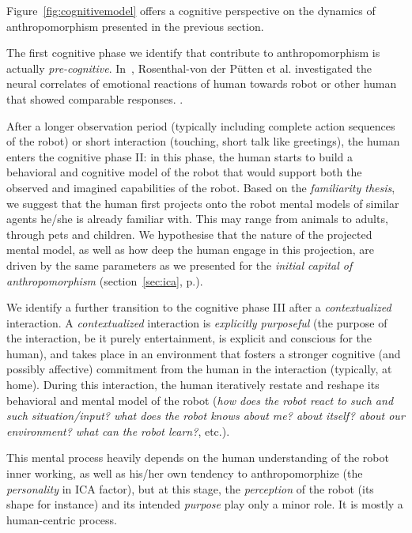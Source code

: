 \documentclass[twocolumn]{svjour3}          %
\begin{document}
Figure~\ref{fig:cognitivemodel} offers a cognitive perspective on the dynamics
of anthropomorphism presented in the previous section.

The first cognitive phase we identify that contribute to anthropomorphism is
actually \emph{pre-cognitive}. In~\cite{Rosenthal-vonderPutten2013Neural},
Rosenthal-von der Pütten et al. investigated the neural correlates of emotional
reactions of human towards robot or other human that showed comparable
responses. .

After a longer observation period (typically including complete action
sequences of the robot) or short interaction (touching, short talk like
greetings), the human enters the cognitive phase II: in this phase, the human
starts to build a behavioral and cognitive model of the robot that would
support both the observed and imagined capabilities of the robot. Based on the
\emph{familiarity thesis}, we suggest that the human first
projects onto the robot mental models of similar agents he/she is already
familiar with. This may range from animals to adults, through pets and
children. We hypothesise that the nature of the projected mental model, as well
as how deep the human engage in this projection, are driven by the same
parameters as we presented for the \emph{initial capital of anthropomorphism}
(section~\ref{sec:ica}, p.\pageref{sec:ica}).

We identify a further transition to the cognitive phase III after a
\emph{contextualized} interaction. A \emph{contextualized} interaction is
\emph{explicitly purposeful} (the purpose of the interaction, be it purely
entertainment, is explicit and conscious for the human), and takes place in an
environment that fosters a stronger cognitive (and possibly affective)
commitment from the human in the interaction (typically, at home). During this
interaction, the human iteratively restate and reshape its behavioral and
mental model of the robot (\emph{how does the robot react to such and such
situation/input? what does the robot knows about me? about itself? about our
environment? what can the robot learn?}, etc.).

This mental process heavily depends on the human understanding of the robot
inner working, as well as his/her own tendency to anthropomorphize (the
\emph{personality} in ICA factor), but at this stage, the \emph{perception} of
the robot (its shape for instance) and its intended \emph{purpose} play only a
minor role. It is mostly a human-centric process.
\end{document}

